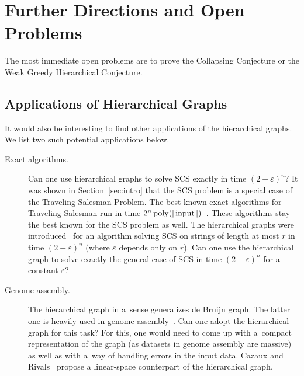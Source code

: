 \section{Further Directions and Open Problems}
The most immediate open problems are to prove the Collapsing Conjecture or the Weak Greedy Hierarchical Conjecture.

\subsection{Applications of Hierarchical Graphs}
It would also be interesting to find other applications of the 
hierarchical graphs. We list two such potential applications below.
\begin{description}
\item[Exact algorithms.] Can one use hierarchical graphs to solve SCS exactly in time $(2-\varepsilon)^n$?
It was shown in Section~\ref{sec:intro} that the SCS problem is a special case of the Traveling Salesman Problem. The best known exact algorithms for Traveling Salesman run in time $2^n \operatorname{poly}(|\operatorname{input}|)$~\cite{B1962, HK1971, KGK1977, K1982, BF1996}. These algorithms stay the best known for the SCS problem as well. The hierarchical graphs were introduced~\cite{scs_exact} for an algorithm solving SCS on strings of length at most $r$ in time $(2-\varepsilon)^n$ (where $\varepsilon$ depends only on $r$). Can one use the hierarchical graph to solve exactly the general case of SCS in time $(2-\varepsilon)^n$ for a constant $\varepsilon$?

\item[Genome assembly.] The hierarchical graph in a~sense
generalizes de Bruijn graph. The latter one is heavily used
in genome assembly~\cite{pevzner2001eulerian}.
Can one adopt the hierarchical graph for this task? For this, one
would need to come up with a~compact representation of the graph
(as datasets in genome assembly are massive) as well as with a~way of
handling errors in the input data. Cazaux and Rivals~\cite{cazaux2018hierarchical} propose a linear-space counterpart of the hierarchical graph.
\end{description}

